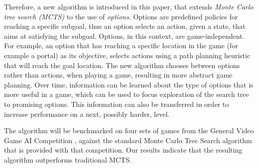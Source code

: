 Therefore, a new algorithm is introduced in this paper, that extends \emph{Monte
Carlo tree search (MCTS)} to the use of \emph{options}. Options are predefined
policies for reaching a specific subgoal, thus an option selects an action,
given a state, that aims at satisfying the subgoal. Options, in this context,
are game-independent. For example, an option that has reaching a specific
location in the game (for example a portal) as its objective, selects actions
using a path planning heuristic that will reach the goal location. The new
algorithm chooses between options rather than actions, when playing a game,
resulting in more abstract game planning. Over time, information can be learned
about the type of options that is more useful in a game, which can be used to
focus exploration of the search tree to promising options. This information can
also be transferred in order to increase performance on a next, possibly harder,
level. 

The algorithm will be benchmarked on four sets of games from the General Video
Game AI Competition \cite{perez2014}, against the standard Monte Carlo Tree
Search algorithm that is provided with that competition.  Our results indicate
that the resulting algorithm outperforms traditional MCTS.

